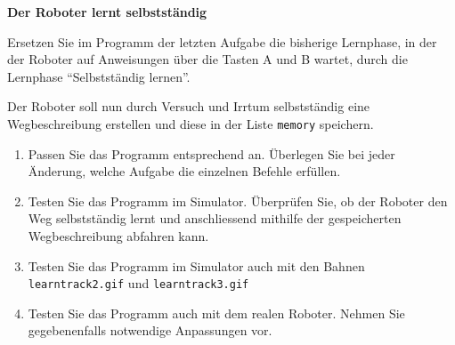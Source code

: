 







\begin{myexercise}
    \textbf{Der Roboter lernt selbstständig}

    Ersetzen Sie im Programm der letzten Aufgabe die bisherige
    Lernphase, in der der Roboter auf Anweisungen über die
    Tasten A und B wartet, durch die Lernphase
    \enquote{Selbstständig lernen}.

    Der Roboter soll nun durch Versuch und Irrtum selbstständig
    eine Wegbeschreibung erstellen und diese in der Liste
    \texttt{memory} speichern.

    \begin{enumerate}
        \item Passen Sie das Programm entsprechend an.
              Überlegen Sie bei jeder Änderung, welche
              Aufgabe die einzelnen Befehle erfüllen.

        \item Testen Sie das Programm im Simulator.
              Überprüfen Sie, ob der Roboter den Weg
              selbstständig lernt und anschliessend
              mithilfe der gespeicherten Wegbeschreibung
              abfahren kann.

        \item Testen Sie das Programm im Simulator auch mit den Bahnen \texttt{learntrack2.gif} und \texttt{learntrack3.gif}

        \item Testen Sie das Programm auch mit dem
              realen Roboter. Nehmen Sie gegebenenfalls
              notwendige Anpassungen vor.
    \end{enumerate}
\end{myexercise}


